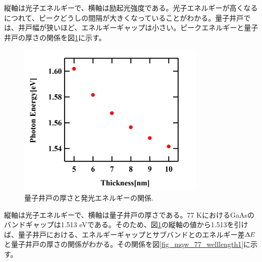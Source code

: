 \documentclass[11pt,a4j]{jsarticle}
\begin{document}
\begin{enumerate}
       \newpage



       縦軸は光子エネルギーで、横軸は励起光強度である。光子エネルギーが高くなるにつれて、ピークどうしの間隔が大きくなっていることがわかる。量子井戸では、井戸幅が狭いほど、エネルギーギャップは小さい。ピークエネルギーと量子井戸の厚さの関係を図\ref{fig_mqw_77_eg1}に示す。

       \newpage

       \begin{figure}[ht]
        \centering
        \includegraphics[clip,width=9cm]{start2_MQW_77K_Eg.jpg}
        \caption{量子井戸の厚さと発光エネルギーの関係.}
        \label{fig_mqw_77_eg1}
       \end{figure}

       縦軸は光子エネルギーで、横軸は量子井戸の厚さである。77 KにおけるGaAsのバンドギャップは1.513 eVである。そのため、図\ref{fig_mqw_77_eg1}の縦軸の値から1.513を引けば、量子井戸における、エネルギーギャップとサブバンドとのエネルギー差$\Updelta E$と量子井戸の厚さの関係がわかる。その関係を図\ref{fig_mqw_77_welllength1}に示す。

       \newpage


\end{enumerate}
\end{document}
